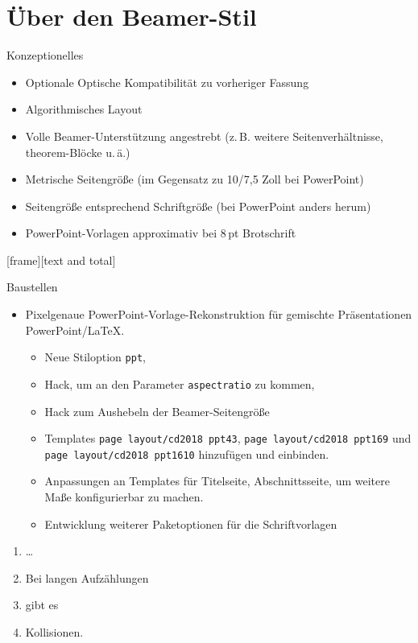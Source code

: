 \section{Über den Beamer-Stil}
\begin{frame}{Konzeptionelles}
  \begin{itemize}
  \item Optionale Optische Kompatibilität zu vorheriger Fassung
  \item<+-> Algorithmisches Layout
  \item<+-> Volle Beamer-Unterstützung angestrebt (z.\,B. weitere Seitenverhältnisse, theorem-Blöcke u.\,ä.)
  \item<+> Metrische Seitengröße (im Gegensatz zu 10/7,5 Zoll bei PowerPoint)
  \item<+> Seitengröße entsprechend Schriftgröße (bei PowerPoint anders herum)
  \item<+-> PowerPoint-Vorlagen approximativ bei 8\,pt Brotschrift
  \end{itemize}
\end{frame}
[frame][text and total]
\begin{frame}{Baustellen}\label{baustellen}
  \begin{itemize}
  \item Pixelgenaue PowerPoint-Vorlage-Rekonstruktion für gemischte Präsentationen PowerPoint/\LaTeX.
    \begin{itemize}
    \item Neue Stiloption \texttt{ppt},
    \item Hack, um an den Parameter \texttt{aspectratio} zu kommen,
    \item Hack zum Aushebeln der Beamer-Seitengröße
    \item Templates \texttt{page layout/cd2018 ppt43}, \texttt{page
        layout/cd2018 ppt169} und \texttt{page layout/cd2018 ppt1610}
      hinzufügen und einbinden.
    \item Anpassungen an Templates für Titelseite, Abschnittsseite, um
      weitere Maße konfigurierbar zu machen.
    \item Entwicklung weiterer Paketoptionen für die Schriftvorlagen
    \end{itemize}
  \end{itemize}
  \begin{enumerate}     
  \item \dots\setcounter{enumi}{8}
  \item Bei langen Aufzählungen 
  \item gibt es
  \item Kollisionen.
  \end{enumerate}
\end{frame}

